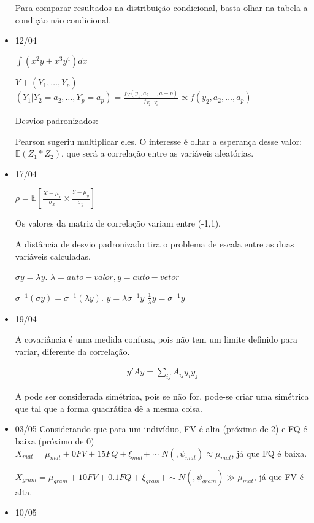 \documentclass[11pt,a4paper]{book}
\begin{document}
\begin{itemize}
		 Para comparar resultados na distribuição condicional, basta olhar na tabela a condição não condicional.
		 
		 \item 12/04
		 
		 $\int (x^2y+x^3y^4)dx$
		 
		 $Y+(Y_1,\ldots,Y_p)$
		 $(Y_1|Y_2=a_2,\ldots,Y_p=a_p)=\frac{f_Y(y_1,a_2,\ldots,a+p)}{f_{Y_2\ldots Y_p}}\propto f(y_2,a_2,\ldots,a_p)$
		 
		 Desvios padronizados:
		 
		 Pearson sugeriu multiplicar eles.
		 O interesse é olhar a esperança desse valor: $\mathbb{E}(Z_1*Z_2)$, que será a correlação entre as variáveis aleatórias.
		 
		 \item 17/04
		 
		 $\rho=\mathbb{E}[\frac{X-\mu_x}{\sigma_x}\times\frac{Y-\mu_y}{\sigma_y}]$
		 
		 Os valores da matriz de correlação variam entre (-1,1).
		 
		 A distância de desvio padronizado tira o problema de escala entre as duas variáveis calculadas.
		 
		 $\sigma y=\lambda y$.
		 $\lambda= auto-valor, y=auto-vetor$
		 
		 
		 $\sigma^{-1}(\sigma y)=\sigma^{-1}(\lambda y)$.
		 $y=\lambda\sigma^{-1}y$
		 $\frac{1}{\lambda}y=\sigma^{-1}y$
		 
		 \item 19/04
		 
		 A covariância é uma medida confusa, pois não tem um limite definido para variar, diferente da correlação.
		 
		 \begin{eqnarray*}
		 	y'Ay=\sum_{ij}A_{ij}y_iy_j
		 \end{eqnarray*}
		 
		 A pode ser considerada simétrica, pois se não for, pode-se criar uma simétrica que tal que a forma quadrática dê a mesma coisa.
		 
		 \item 03/05
		 Considerando que para um indivíduo, FV é alta (próximo de 2) e FQ é baixa (próximo de 0)
		 $X_{mat}=\mu_{mat}+0FV+15FQ+\xi_{mat}+\sim N(,\psi_{mat})\approx \mu_{mat}$, já que FQ é baixa.
		 
		 $X_{gram}=\mu_{gram}+10FV+0.1FQ+\xi_{gram}+\sim N(,\psi_{gram})\gg \mu_{mat}$, já que FV é alta.
		 
		 \item
		 10/05
		 

\end{itemize}
\end{document}
